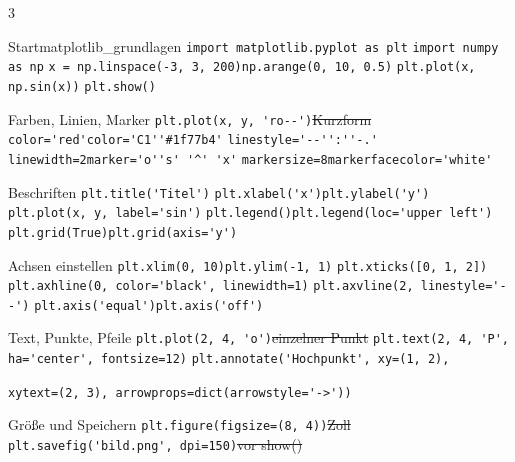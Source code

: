 \documentclass[9pt,a4paper,landscape]{extarticle}
\begin{document}
\begin{multicols*}{3}

\begin{merkblock}[1 Grundlagen]{Start}{matplotlib\_grundlagen}
\lstinline!import matplotlib.pyplot as plt!\zl
\lstinline!import numpy as np!\zl
\lstinline!x = np.linspace(-3, 3, 200)!\quad\lstinline!np.arange(0, 10, 0.5)!\zl
\lstinline!plt.plot(x, np.sin(x))!\zl
\lstinline!plt.show()!\zl
\end{merkblock}

\begin{merkblock}{Farben, Linien, Marker}{}
\lstinline!plt.plot(x, y, 'ro--')!\st{Kurzform}
\lstinline!color='red'!\quad\lstinline!color='C1'!\quad\lstinline!'#1f77b4'!\zl
\lstinline!linestyle='--'!\quad\lstinline!':'!\quad\lstinline!'-.'!\zl
\lstinline!linewidth=2!\quad\lstinline!marker='o'!\quad\lstinline!'s' '^' 'x'!\zl
\lstinline!markersize=8!\quad\lstinline!markerfacecolor='white'!\zl
\end{merkblock}

\begin{merkblock}{Beschriften}{}
\lstinline!plt.title('Titel')!\zl
\lstinline!plt.xlabel('x')!\quad\lstinline!plt.ylabel('y')!\zl
\lstinline!plt.plot(x, y, label='sin')!\zl
\lstinline!plt.legend()!\quad\lstinline!plt.legend(loc='upper left')!\zl
\lstinline!plt.grid(True)!\quad\lstinline!plt.grid(axis='y')!\zl
\end{merkblock}

\begin{merkblock}{Achsen einstellen}{}
\lstinline!plt.xlim(0, 10)!\quad\lstinline!plt.ylim(-1, 1)!\zl
\lstinline!plt.xticks([0, 1, 2])!\zl
\lstinline!plt.axhline(0, color='black', linewidth=1)!\zl
\lstinline!plt.axvline(2, linestyle='--')!\zl
\lstinline!plt.axis('equal')!\quad\lstinline!plt.axis('off')!\zl
\end{merkblock}

\begin{merkblock}{Text, Punkte, Pfeile}{}
\lstinline!plt.plot(2, 4, 'o')!\st{einzelner Punkt}
\lstinline!plt.text(2, 4, 'P', ha='center', fontsize=12)!\zl
\lstinline!plt.annotate('Hochpunkt', xy=(1, 2),!\par
\quad\lstinline!xytext=(2, 3), arrowprops=dict(arrowstyle='->'))!\zl
\end{merkblock}

\begin{merkblock}{Größe und Speichern}{}
\lstinline!plt.figure(figsize=(8, 4))!\st{Zoll}
\lstinline!plt.savefig('bild.png', dpi=150)!\st{vor show()}
\end{merkblock}


\end{multicols*}
\end{document}

